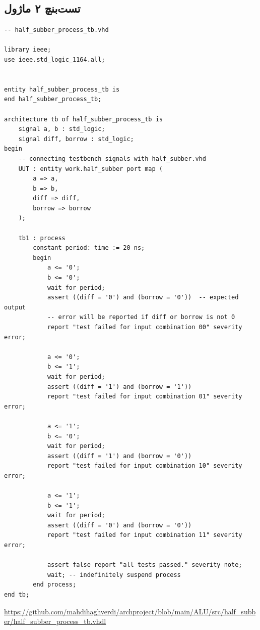 \documentclass[dvipsnames, svgnames, x11names, a4paper, 11pt, oneside]{book}
\begin{document}
				\subsection{تست‌بنچ ۲ ماژول}
				
				\begin{latin}
					
					\begin{lstlisting}
-- half_subber_process_tb.vhd

library ieee;
use ieee.std_logic_1164.all;


entity half_subber_process_tb is
end half_subber_process_tb;

architecture tb of half_subber_process_tb is
	signal a, b : std_logic;
	signal diff, borrow : std_logic;
begin
	-- connecting testbench signals with half_subber.vhd
	UUT : entity work.half_subber port map (
		a => a,
		b => b,
		diff => diff,
		borrow => borrow
	);
	
	tb1 : process
		constant period: time := 20 ns;
		begin
			a <= '0';
			b <= '0';
			wait for period;
			assert ((diff = '0') and (borrow = '0'))  -- expected output
			-- error will be reported if diff or borrow is not 0
			report "test failed for input combination 00" severity error;
			
			a <= '0';
			b <= '1';
			wait for period;
			assert ((diff = '1') and (borrow = '1'))
			report "test failed for input combination 01" severity error;
			
			a <= '1';
			b <= '0';
			wait for period;
			assert ((diff = '1') and (borrow = '0'))
			report "test failed for input combination 10" severity error;
			
			a <= '1';
			b <= '1';
			wait for period;
			assert ((diff = '0') and (borrow = '0'))
			report "test failed for input combination 11" severity error;
			
			assert false report "all tests passed." severity note;
			wait; -- indefinitely suspend process
		end process;
end tb;
					\end{lstlisting}
					\url{https://github.com/mahdihaghverdi/archproject/blob/main/ALU/src/half_subber/half_subber_process_tb.vhdl}
				\end{latin}
\end{document}
